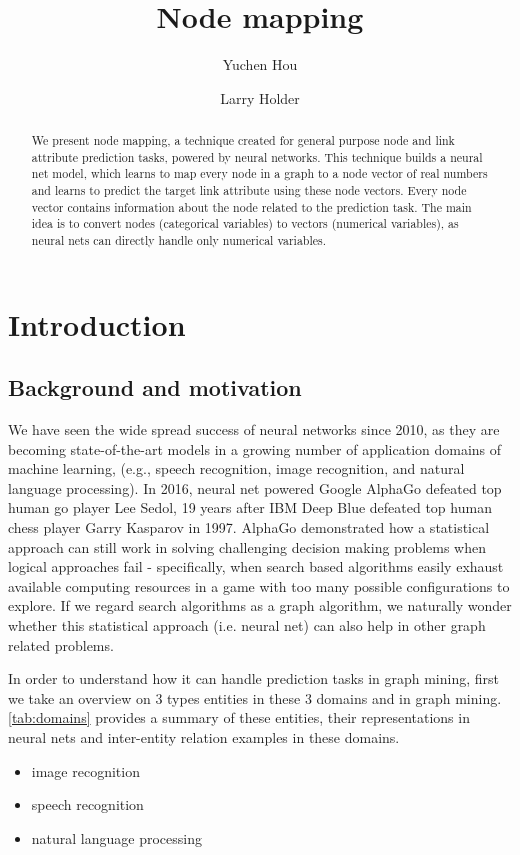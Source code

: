 \documentclass{article}
\begin{document}
\lstset{language=python, tabsize=4}
\title{Node mapping}
\author{Yuchen Hou \and Larry Holder}
\maketitle

\begin{abstract}
	We present node mapping, a technique created for general purpose node and 
	link attribute prediction tasks, powered by neural networks.
	This technique builds a neural net model, which learns to map every node in 
	a graph to a node vector of real numbers and learns to predict the target 
	link attribute using these node vectors.
	Every node vector contains information about the node related to the
	prediction task.
	The main idea is to convert nodes (categorical variables) to vectors 
	(numerical variables), as neural nets can directly handle only numerical 
	variables.
\end{abstract}

\section{Introduction}

\subsection{Background and motivation}
We have seen the wide spread success of neural networks since 2010, as they are becoming state-of-the-art models in a growing number of application domains of machine learning, (e.g., speech recognition\cite{hannun2014deep}, image recognition\cite{simonyan2014very}, and natural language processing\cite{yao2013recurrent}).
In 2016, neural net powered Google AlphaGo defeated top human go player Lee Sedol, 19 years after IBM Deep Blue defeated top human chess player Garry Kasparov in 1997.
AlphaGo demonstrated how a statistical approach can still work in solving challenging decision making problems when logical approaches fail - specifically, when search based algorithms easily exhaust available computing resources in a game with too many possible configurations to explore\cite{silver2016mastering}.
If we regard search algorithms as a graph algorithm, we naturally wonder whether this statistical approach (i.e. neural net) can also help in other graph related problems.

In order to understand how it can handle prediction tasks in graph mining, first we take an overview on 3 types entities in these 3 domains and in graph mining. \autoref{tab:domains} provides a summary of these entities, their representations in neural nets and inter-entity relation examples in these domains.
\begin{itemize}
	\item image recognition
	\item speech recognition
	\item natural language processing
\end{itemize}
\end{document}
